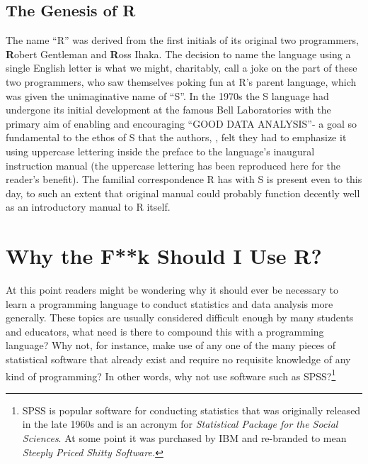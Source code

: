 \subsection{The Genesis of R}

The name ``R'' was derived from the first initials of its original two programmers, \textbf{R}obert Gentleman and \textbf{R}oss Ihaka.  The decision to name the language using a single English letter is what we might, charitably, call a joke on the part of these two programmers, who saw themselves poking fun at R's parent language, which was given the unimaginative name of ``S''. In the 1970s the S language had undergone its initial development at the famous Bell Laboratories with the primary aim of enabling and encouraging ``GOOD DATA ANALYSIS''- a goal so fundamental to the ethos of S that the authors, \textcite{Becker1984}, felt they had to emphasize it using uppercase lettering inside the preface to the language's inaugural instruction manual (the uppercase lettering has been reproduced here for the reader's benefit). The familial correspondence R has with S is present even to this day, to such an extent that \textcite{Becker1984} original manual could probably function decently well as an introductory manual to R itself.

\section{Why the F**k Should I Use R?}

At this point readers might be wondering why it should ever be necessary to learn a programming language to conduct statistics and data analysis more generally. These topics are usually considered difficult enough by many students and educators, what need is there to compound this with a programming language? Why not, for instance, make use of any one of the many pieces of statistical software that already exist and require no requisite knowledge of any kind of programming? In other words, why not use software such as SPSS?\footnote{SPSS is popular software for conducting statistics that was originally released in the late 1960s and is an acronym for \textit{Statistical Package for the Social Sciences}. At some point it was purchased by IBM and re-branded to mean \textit{Steeply Priced Shitty Software.}}

